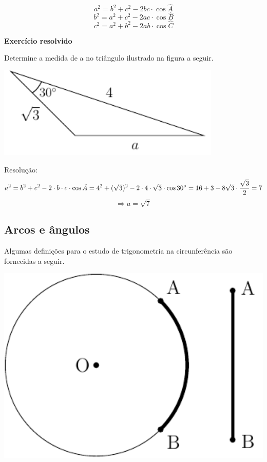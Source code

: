 $$a^2 = b^2 + c^2 -2bc\cdot\cos\hat{A}$$
$$b^2 = a^2 + c^2 -2ac\cdot\cos\hat{B}$$
$$c^2 = a^2 + b^2 -2ab\cdot\cos\hat{C}$$

\noindent
\textbf{Exercício resolvido} \\
\begin{minipage}{0.5\textwidth}
    Determine a medida de a no triângulo ilustrado na figura a seguir.
\end{minipage}
\vspace{1cm}
\begin{minipage}{0.5\textwidth}
\vspace{1cm}
\centering
\includegraphics[width=0.8\textwidth]{Imagens/fig04.pdf}
\end{minipage}
Resolução:
\[
a^2=b^2+c^2-2 \cdot b \cdot c \cdot \cos \hat{A} = 4^2+(\sqrt{3})^2-2 \cdot 4 \cdot \sqrt{3} \cdot \cos 30 \degree = 16 + 3 -8 \sqrt{3} \cdot \dfrac{\sqrt{3}}{2}=7
\]
\[
\Rightarrow a=\sqrt{7}
\]

\subsection{Arcos e ângulos}

Algumas definições para o estudo de trigonometria na circunferência são fornecidas a seguir.\\
\begin{center}
\begin{minipage}{6cm}
        \centering
            \includegraphics[width=1.2\textwidth]{Imagens/fig05.pdf}
            \label{fig:fig05}
\end{minipage}
\end{center}

